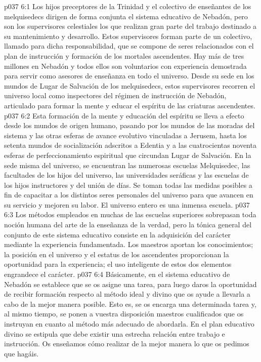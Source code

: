 \vs p037 6:1 Los hijos preceptores de la Trinidad y el colectivo de enseñantes de los melquisedecs dirigen de forma conjunta el sistema educativo de Nebadón, pero son los supervisores celestiales los que realizan gran parte del trabajo destinado a su mantenimiento y desarrollo. Estos supervisores forman parte de un colectivo, llamado para dicha responsabilidad, que se compone de seres relacionados con el plan de instrucción y formación de los mortales ascendentes. Hay más de tres millones en Nebadón y todos ellos son voluntarios con experiencia demostrada para servir como asesores de enseñanza en todo el universo. Desde su sede en los mundos de Lugar de Salvación de los melquisedecs, estos supervisores recorren el universo local como inspectores del régimen de instrucción de Nebadón, articulado para formar la mente y educar el espíritu de las criaturas ascendentes.
\vs p037 6:2 Esta formación de la mente y educación del espíritu se lleva a efecto desde los mundos de origen humano, pasando por los mundos de las moradas del sistema y las otras esferas de avance evolutivo vinculadas a Jerusem, hasta los setenta mundos de socialización adscritos a Edentia y a las cuatrocientas noventa esferas de perfeccionamiento espiritual que circundan Lugar de Salvación. En la sede misma del universo, se encuentran las numerosas escuelas Melquisedec, las facultades de los hijos del universo, las universidades seráficas y las escuelas de los hijos instructores y del unión de días. Se toman todas las medidas posibles a fin de capacitar a los distintos seres personales del universo para que avancen en su servicio y mejoren su labor. El universo entero es una inmensa escuela.
\vs p037 6:3 \pc Los métodos empleados en muchas de las escuelas superiores sobrepasan toda noción humana del arte de la enseñanza de la verdad, pero la tónica general del conjunto de este sistema educativo consiste en la adquisición del carácter mediante la experiencia fundamentada. Los maestros aportan los conocimientos; la posición en el universo y el estatus de los ascendentes proporcionan la oportunidad para la experiencia; el uso inteligente de estos dos elementos engrandece el carácter.
\vs p037 6:4 Básicamente, en el sistema educativo de Nebadón se establece que se os asigne una tarea, para luego daros la oportunidad de recibir formación respecto al método ideal y divino que os ayude a llevarla a cabo de la mejor manera posible. Esto es, se os encarga una determinada tarea y, al mismo tiempo, se ponen a vuestra disposición maestros cualificados que os instruyan en cuanto al método más adecuado de abordarla. En el plan educativo divino se estipula que debe existir una estrecha relación entre trabajo e instrucción. Os enseñamos cómo realizar de la mejor manera lo que os pedimos que hagáis.

